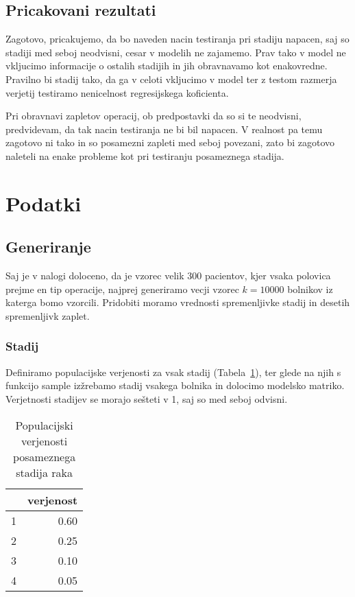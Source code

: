 \documentclass[letterpaper,11pt]{article}
\begin{document}
\subsection{Pricakovani rezultati}
Zagotovo, pricakujemo, da bo naveden nacin testiranja pri stadiju napacen, saj so stadiji med seboj neodvisni, cesar v modelih ne zajamemo. Prav tako v model ne vkljucimo informacije o ostalih stadijih in jih obravnavamo kot enakovredne. Pravilno bi stadij tako,  da ga v celoti vkljucimo v model ter z testom razmerja verjetij testiramo nenicelnost regresijskega koficienta.

\noindent Pri obravnavi zapletov operacij, ob predpostavki da so si te neodvisni, predvidevam, da tak nacin testiranja ne bi bil napacen. V realnost pa temu zagotovo ni tako in so posamezni zapleti med seboj povezani, zato bi zagotovo naleteli na enake probleme kot pri testiranju posameznega stadija.

\section{Podatki}
\subsection{Generiranje}
Saj je v nalogi doloceno, da je vzorec velik 300 pacientov, kjer vsaka polovica prejme en tip operacije, najprej generiramo vecji vzorec $k=10000$ bolnikov iz katerga bomo vzorcili. Pridobiti moramo vrednosti spremenljivke stadij in desetih spremenljivk zaplet.

\subsubsection{Stadij}
Definiramo populacijske verjenosti za vsak stadij (Tabela~\ref{table:1}), ter glede na njih s funkcijo sample izžrebamo stadij vsakega bolnika in dolocimo modelsko matriko. Verjetnosti stadijev se morajo sešteti v 1, saj so med seboj odvisni.

\begin{table}[ht]
\centering
\begin{tabular}{rr}
  \hline
 & verjenost \\ 
  \hline
1 & 0.60 \\ 
  2 & 0.25 \\ 
  3 & 0.10 \\ 
  4 & 0.05 \\ 
   \hline
\end{tabular}
\caption{Populacijski verjenosti posameznega stadija raka} 
\label{table:1}
\end{table}
\end{document}
